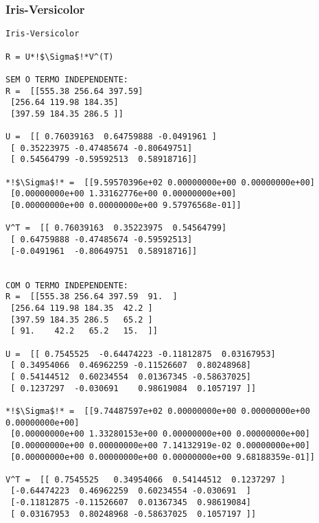 \documentclass[a4paper,12pt,twoside]{article}
\begin{document}
\subsubsection{Iris-Versicolor}
\begin{lstlisting}
Iris-Versicolor

R = U*!$\Sigma$!*V^(T)

SEM O TERMO INDEPENDENTE: 
R =  [[555.38 256.64 397.59]
 [256.64 119.98 184.35]
 [397.59 184.35 286.5 ]]

U =  [[ 0.76039163  0.64759888 -0.0491961 ]
 [ 0.35223975 -0.47485674 -0.80649751]
 [ 0.54564799 -0.59592513  0.58918716]]

*!$\Sigma$!* =  [[9.59570396e+02 0.00000000e+00 0.00000000e+00]
 [0.00000000e+00 1.33162776e+00 0.00000000e+00]
 [0.00000000e+00 0.00000000e+00 9.57976568e-01]]

V^T =  [[ 0.76039163  0.35223975  0.54564799]
 [ 0.64759888 -0.47485674 -0.59592513]
 [-0.0491961  -0.80649751  0.58918716]]


COM O TERMO INDEPENDENTE: 
R =  [[555.38 256.64 397.59  91.  ]
 [256.64 119.98 184.35  42.2 ]
 [397.59 184.35 286.5   65.2 ]
 [ 91.    42.2   65.2   15.  ]]

U =  [[ 0.7545525  -0.64474223 -0.11812875  0.03167953]
 [ 0.34954066  0.46962259 -0.11526607  0.80248968]
 [ 0.54144512  0.60234554  0.01367345 -0.58637025]
 [ 0.1237297  -0.030691    0.98619084  0.1057197 ]]

*!$\Sigma$!* =  [[9.74487597e+02 0.00000000e+00 0.00000000e+00 0.00000000e+00]
 [0.00000000e+00 1.33280153e+00 0.00000000e+00 0.00000000e+00]
 [0.00000000e+00 0.00000000e+00 7.14132919e-02 0.00000000e+00]
 [0.00000000e+00 0.00000000e+00 0.00000000e+00 9.68188359e-01]]

V^T =  [[ 0.7545525   0.34954066  0.54144512  0.1237297 ]
 [-0.64474223  0.46962259  0.60234554 -0.030691  ]
 [-0.11812875 -0.11526607  0.01367345  0.98619084]
 [ 0.03167953  0.80248968 -0.58637025  0.1057197 ]]
\end{lstlisting}
\end{document}
